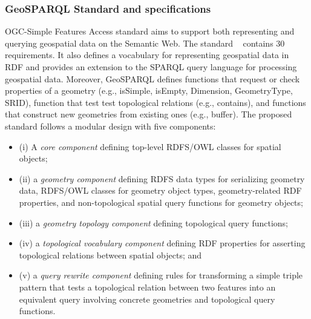 \begin{table}[!htbp]
\end{table}

\subsubsection{GeoSPARQL Standard and specifications}
\label{sec:specgeosparql}

OGC-Simple Features Access standard aims to support both representing and querying geospatial data on the Semantic Web. The standard ~\cite{ogc2012} contains 30 requirements. It also defines a vocabulary for representing geospatial data in RDF and provides an extension to the SPARQL query language for processing geospatial data. 
Moreover, GeoSPARQL defines functions that request or check properties of a geometry (e.g., isSimple, isEmpty, Dimension, GeometryType, SRID), function that test test topological relations (e.g., contains),
and functions that construct new geometries from existing ones (e.g., buffer). 
 The proposed standard follows a modular design with five components: 
\begin{itemize}
\item (i) A \textit{core component} defining top-level RDFS/OWL classes for spatial objects; 
\item (ii) a \textit{geometry component} defining RDFS data types for serializing geometry data, RDFS/OWL classes for geometry object types, geometry-related RDF properties, and non-topological spatial query functions for geometry objects; 
\item (iii) a \textit{geometry topology component} defining topological query functions; 
\item (iv) a \textit{topological vocabulary component} defining RDF properties for asserting topological relations between spatial objects; and 
\item (v) a \textit{query rewrite component} defining rules for transforming a simple triple pattern that tests a topological relation between two features into an equivalent query involving concrete geometries and topological query functions.
\end{itemize}

